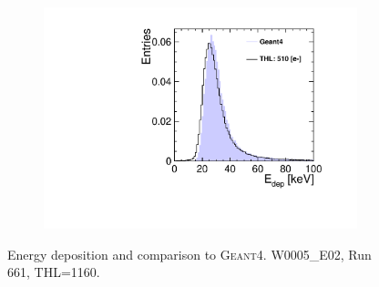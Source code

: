 \begin{figure}[htbp]
\begin{subfigure}[b]{0.32\textwidth}
    \includegraphics[width=\textwidth]{./figures/Calibration/Edep_G4_W0005_E02.pdf}
    \caption{}
  \end{subfigure}
  \caption{Energy deposition and comparison to
    \textsc{Geant4}. W0005\_E02, Run 661, THL=1160.}
  \label{fig:EdepW5E2}
\end{figure}

